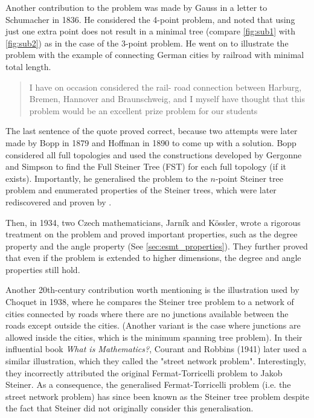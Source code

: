 \documentclass{l4proj}
\begin{document}
Another contribution to the problem was made by Gauss in a letter to Schumacher in 1836. He considered the 4-point problem, and noted that using just one extra point does not result in a minimal tree (compare \ref{fig:sub1} with \ref{fig:sub2}) as in the case of the 3-point problem. He went on to illustrate the problem with the example of connecting German cities by railroad with minimal total length.
\begin{quote}
      I have on occasion considered the rail- road connection between Harburg, Bremen, Hannover and Braunschweig, and I myself have thought that this problem would be an excellent prize problem for our students
\end{quote}

The last sentence of the quote proved correct, because two attempts were later made by Bopp in 1879 and Hoffman in 1890 to come up with a solution. Bopp considered all full topologies and used the constructions developed by Gergonne and Simpson to find the Full Steiner Tree (FST) for each full topology (if it exists). Importantly, he generalised the problem to the $n$-point Steiner tree problem and enumerated properties of the Steiner trees, which were later rediscovered and proven by \cite{Gilbert1968SteinerMT}.

Then, in 1934, two Czech mathematicians, Jarník and Kössler, wrote a rigorous treatment on the problem and proved important properties, such as the degree property and the angle property (See \ref{sec:esmt_properties}). They further proved that even if the problem is extended to higher dimensions, the degree and angle properties still hold.

Another 20th-century contribution worth mentioning is the illustration used by Choquet in 1938, where he compares the Steiner tree problem to a network of cities connected by roads where there are no junctions available between the roads except outside the cities. (Another variant is the case where junctions are allowed inside the cities, which is the minimum spanning tree problem). In their influential book \textit{What is Mathematics?}, Courant and Robbins (1941) later used a similar illustration, which they called the "street network problem". Interestingly, they incorrectly attributed the original Fermat-Torricelli problem to Jakob Steiner. As a consequence, the generalised Fermat-Torricelli problem (i.e. the street network problem) has since been known as the Steiner tree problem despite the fact that Steiner did not originally consider this generalisation.
\end{document}
